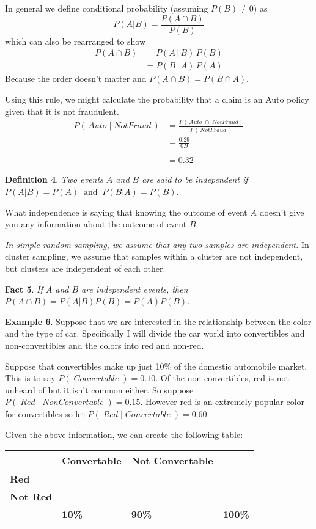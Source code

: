 \documentclass[]{book}
\begin{document}
In general we define conditional probability (assuming \(P(B) \ne 0\))
as \[P(A|B)=\frac{P(A\cap B)}{P(B)}\] which can also be rearranged to
show \[\begin{aligned}
P(A\cap B)  &=  P(A\,|\,B)\,P(B) \\
              &=    P(B\,|\,A)\,P(A)
\end{aligned}\] Because the order doesn't matter and
\(P\left(A\cap B\right)=P\left(B\cap A\right)\).

Using this rule, we might calculate the probability that a claim is an
Auto policy given that it is not fraudulent. \[\begin{aligned}
P\left(\,Auto\;|\;NotFraud\,\right) &= \frac{P\left(\,Auto\;\cap\;NotFraud\right)}{P\left(\,NotFraud\,\right)} \\
    &=  \frac{0.29}{0.9} \\
    &   \\
    &=  0.3\bar{2}
    \end{aligned}\]

\textbf{Definition 4}. \emph{Two events \(A\) and \(B\) are said to be
independent if \(P(A|B)=P(A)\;\;\textrm{and}\;\;P(B|A)=P(B)\).}

What independence is saying that knowing the outcome of event \(A\)
doesn't give you any information about the outcome of event \(B\).

\emph{In simple random sampling, we assume that any two samples are
independent. } In cluster sampling, we assume that samples within a
cluster are not independent, but clusters are independent of each other.

\textbf{Fact 5}. \emph{If \(A\) and \(B\) are independent events, then
\(P(A\cap B) = P(A|B)P(B) = P(A)P(B)\).}

\textbf{Example 6}. Suppose that we are interested in the relationship
between the color and the type of car. Specifically I will divide the
car world into convertibles and non-convertibles and the colors into red
and non-red.

Suppose that convertibles make up just 10\% of the domestic automobile
market. This is to say \(P(\;Convertable\;)=0.10\). Of the
non-convertibles, red is not unheard of but it isn't common either. So
suppose \(P(\;Red\;|\;NonConvertable\;)=0.15\). However red is an
extremely popular color for convertibles so let
\(P(\;Red\;|\;Convertable\;)=0.60\).

Given the above information, we can create the following table:

\begin{longtable}[]{@{}llll@{}}
\toprule
\(\,\) & Convertable & Not Convertable & \(\,\)\tabularnewline
\midrule
\endhead
\textbf{Red} & & &\tabularnewline
\textbf{Not Red} & & &\tabularnewline
\(\,\) & \textbf{10\%} & \textbf{90\%} & \textbf{100\%}\tabularnewline
\bottomrule
\end{longtable}
\end{document}
